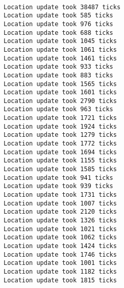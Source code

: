 \documentclass[12pt,a4paper]{article}
\begin{document}
	\texttt{\\
    Location update took 38487 ticks\\
    Location update took 585 ticks\\
    Location update took 976 ticks\\
    Location update took 688 ticks\\
    Location update took 1045 ticks\\
    Location update took 1061 ticks\\
    Location update took 1461 ticks\\
    Location update took 933 ticks\\
    Location update took 883 ticks\\
    Location update took 1565 ticks\\
    Location update took 1601 ticks\\
    Location update took 2790 ticks\\
    Location update took 963 ticks\\
    Location update took 1721 ticks\\
    Location update took 1924 ticks\\
    Location update took 1279 ticks\\
    Location update took 1772 ticks\\
    Location update took 1694 ticks\\
    Location update took 1155 ticks\\
    Location update took 1585 ticks\\
    Location update took 941 ticks\\
    Location update took 939 ticks\\
    Location update took 1731 ticks\\
    Location update took 1007 ticks\\
    Location update took 2120 ticks\\
    Location update took 1326 ticks\\
    Location update took 1021 ticks\\
    Location update took 1062 ticks\\
    Location update took 1424 ticks\\
    Location update took 1746 ticks\\
    Location update took 1001 ticks\\
    Location update took 1182 ticks\\
    Location update took 1815 ticks\\
}
\end{document}
